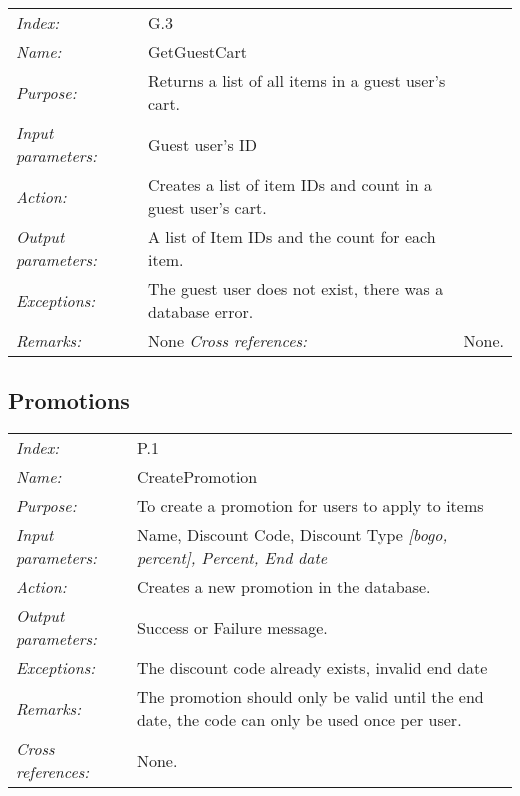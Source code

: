 \documentclass[10pt,letter]{article}
\begin{document}
\begin{tabularx}{\textwidth}{l X}
    \it{Index:} & G.3 \\
    \it{Name:} & GetGuestCart \\
    \it{Purpose:} & Returns a list of all items in a guest user's cart. \\
    \it{Input parameters:} & Guest user's ID \\
    \it{Action:} & Creates a list of item IDs and count in a guest user's cart. \\
    \it{Output parameters:} & A list of Item IDs and the count for each item. \\
    \it{Exceptions:} & The guest user does not exist, there was a database error. \\
    \it{Remarks:} & None 
    \it{Cross references:} & None. \\
    \hline
\end{tabularx}

\subsection{Promotions}

\begin{tabularx}{\textwidth}{l X}
    \it{Index:} & P.1 \\
    \it{Name:} & CreatePromotion \\
    \it{Purpose:} & To create a promotion for users to apply to items \\
    \it{Input parameters:} & Name, Discount Code, Discount Type \it{[bogo, percent]}, Percent, End date\\
    \it{Action:} & Creates a new promotion in the database.\\
    \it{Output parameters:} & Success or Failure message. \\
    \it{Exceptions:} & The discount code already exists, invalid end date \\
    \it{Remarks:} & The promotion should only be valid until the end date, the code can only be used once per user. \\
    \it{Cross references:} & None. \\
    \hline
\end{tabularx}
\end{document}
